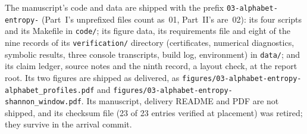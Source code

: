 \documentclass[11pt]{article}
\numberwithin{equation}{section}
\theoremstyle{definition}
\theoremstyle{remark}
\begin{document}
\begin{sloppypar}
The manuscript's code and data are shipped with the prefix
\texttt{03-alphabet-entropy-} (Part~I's unprefixed files count as~01,
Part~II's are~02): its four scripts and its Makefile in
\nolinkurl{code/}; its figure data, its requirements file and eight of
the nine records of its \nolinkurl{verification/} directory
(certificates, numerical diagnostics, symbolic results, three console
transcripts, build log, environment) in \nolinkurl{data/}; and its claim
ledger, source notes and the ninth record, a layout check, at the report
root. Its two figures are shipped as
delivered, as \nolinkurl{figures/03-alphabet-entropy-alphabet_profiles.pdf}
and \nolinkurl{figures/03-alphabet-entropy-shannon_window.pdf}. Its
manuscript, delivery README and PDF are not shipped, and its checksum
file (23 of 23 entries verified at placement) was retired; they survive
in the arrival commit.
\end{sloppypar}
\end{document}
